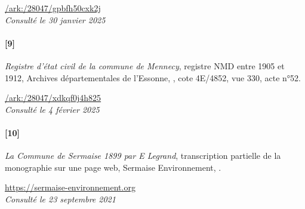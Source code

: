 \documentclass[../eBook.tex]{subfiles}
\begin{document}
      \hspace*{\fill}\href{https://archives.essonne.fr/ark:/28047/gpbfh50cxk2j/47c982d3-98aa-4660-a8ec-319d75a6cebd}{\color{blue}/ark:/28047/gpbfh50cxk2j}\\
      \hspace*{\fill}\textit{Consulté le 30 janvier 2025}
      \paragraph{[9]}\textit{Registre d'état civil de la commune de Mennecy}, registre NMD entre 1905 et 1912, Archives départementales de l’Essonne, , cote 4E/4852, vue 330, acte n°52.
      \medskip

      \hspace*{\fill}\href{https://archives.essonne.fr/ark:/28047/xdkqf0j4h825/ffc7092b-bcb4-4189-bb4a-037494b9199c}{\color{blue}/ark:/28047/xdkqf0j4h825}\\
      \hspace*{\fill}\textit{Consulté le 4 février 2025}
      \paragraph{[10]}\textit{La Commune de Sermaise 1899 par E Legrand}, transcription partielle de la monographie sur une page web, Sermaise Environnement, .
      \medskip

      \hspace*{\fill}\href{https://web.archive.org/web/20210923214057/https://www.sermaise-environnement.org/communedesermais/index.html}{\color{blue}https://sermaise-environnement.org}\\
      \hspace*{\fill}\textit{Consulté le 23 septembre 2021}
    \newpage
\end{document}
